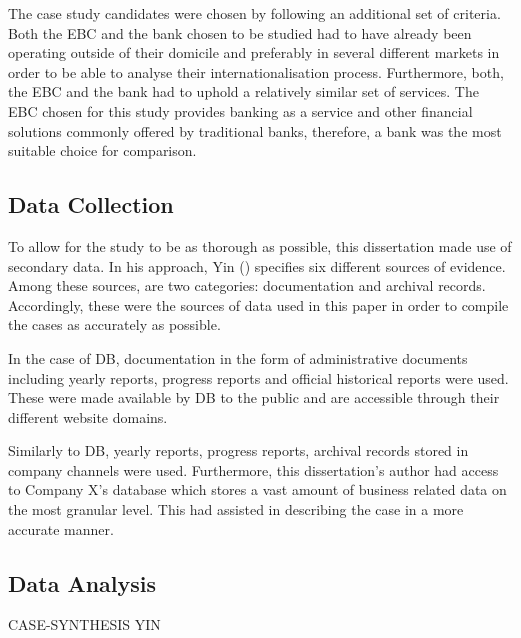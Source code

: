 \documentclass[11pt,a4paper]{article}
\begin{document}
{{The case study candidates were chosen by following an additional set of criteria. Both the EBC and the bank chosen to be studied had to have already been operating outside of their domicile and preferably in several different markets in order to be able to analyse their internationalisation process.  Furthermore, both, the EBC and the bank had to uphold a relatively similar set of services. The EBC chosen for this study provides banking as a service and other financial solutions commonly offered by traditional banks, therefore, a bank was the most suitable choice for comparison. 



\subsection{Data Collection}
To allow for the study to be as thorough as possible, this dissertation made use of secondary data. In his approach, Yin (\citeyear{yinCaseStudyResearch2017}) specifies six different sources of evidence. Among these sources, are two categories: documentation and archival records. Accordingly, these were the sources of data used in this paper in order to compile the cases as accurately as possible.  \par
In the case of DB, documentation in the form of administrative documents including yearly reports, progress reports and official historical reports were used. These were made available by DB to the public and are accessible through their different website domains. \par
Similarly to DB, yearly reports, progress reports, archival records stored in company channels were used. Furthermore, this dissertation's author had access to Company X's database which stores a vast amount of business related data on the most granular level. This had assisted in describing the case in a more accurate manner.

\subsection{Data Analysis}
CASE-SYNTHESIS YIN


}}
\end{document}
